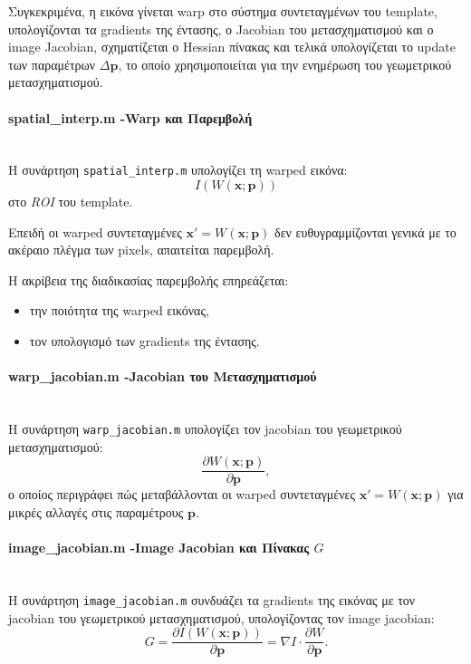 \documentclass[12pt]{article}
\begin{document}
Συγκεκριμένα, η εικόνα γίνεται warp στο σύστημα συντεταγμένων του template, υπολογίζονται τα gradients της έντασης, ο Jacobian του μετασχηματισμού και ο image Jacobian, 
σχηματίζεται ο Hessian πίνακας και τελικά υπολογίζεται το update των παραμέτρων \(\Delta \mathbf{p}\), το οποίο χρησιμοποιείται για την ενημέρωση του γεωμετρικού μετασχηματισμού.

\paragraph{spatial\_interp.m -Warp και Παρεμβολή}
\mbox{}\\
Η συνάρτηση \texttt{spatial\_interp.m} υπολογίζει τη warped εικόνα:
\[
I(W(\mathbf{x};\mathbf{p}))
\]
στο \textit{ROI} του template.

Επειδή οι warped συντεταγμένες \(\mathbf{x}' = W(\mathbf{x};\mathbf{p})\) δεν ευθυγραμμίζονται γενικά με το ακέραιο πλέγμα των pixels, απαιτείται παρεμβολή.

Η ακρίβεια της διαδικασίας παρεμβολής επηρεάζεται:
\begin{itemize}
    \item την ποιότητα της warped εικόνας,
    \item τον υπολογισμό των gradients της έντασης.
\end{itemize}

\paragraph{warp\_jacobian.m -Jacobian του Μετασχηματισμού}
\mbox{}\\
Η συνάρτηση \texttt{warp\_jacobian.m} υπολογίζει τον jacobian του γεωμετρικού μετασχηματισμού:
\[
\frac{\partial W(\mathbf{x};\mathbf{p})}{\partial \mathbf{p}},
\]
ο οποίος περιγράφει πώς μεταβάλλονται οι warped συντεταγμένες \(\mathbf{x}' = W(\mathbf{x};\mathbf{p})\) για μικρές αλλαγές στις παραμέτρους \(\mathbf{p}\).

\paragraph{image\_jacobian.m -Image Jacobian και Πίνακας \(G\)}
\mbox{}\\
Η συνάρτηση \texttt{image\_jacobian.m} συνδυάζει τα gradients της εικόνας με τον jacobian του γεωμετρικού μετασχηματισμού, υπολογίζοντας τον image jacobian:
\[
G =
\frac{\partial I(W(\mathbf{x};\mathbf{p}))}{\partial \mathbf{p}}
=
\nabla I \cdot \frac{\partial W}{\partial \mathbf{p}}.
\]
\end{document}
